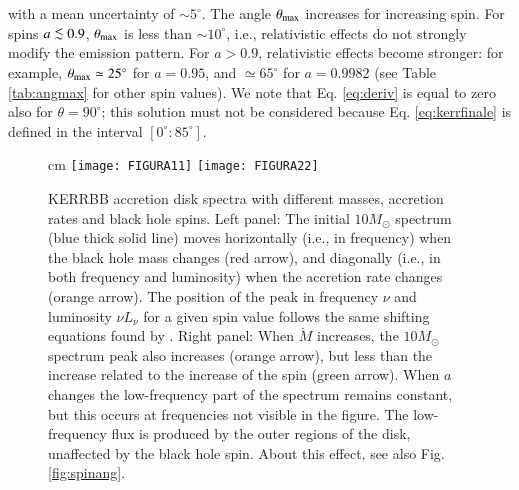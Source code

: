 \documentclass{aa}
\def\spose#1{\hbox to 0pt{#1\hss}}
\newcommand\lsim{\mathrel{\spose{\lower 3pt\hbox{$\mathchar"218$}}
     \raise 2.0pt\hbox{$\mathchar"13C$}}}
\begin{document}
\noindent with a mean uncertainty of $\sim 5^{\circ}$. The angle $\theta_{\rm max}$ increases for increasing spin. For spins $a \lsim 0.9$, $\theta_{\rm max}$ is less than $\sim 10^{\circ}$, i.e., relativistic effects do not strongly modify the emission pattern. For $a > 0.9$, relativistic effects become stronger: for example, $\theta_{\rm max} \simeq 25^{\circ}$ for $a = 0.95$, and $\simeq 65^{\circ}$ for $a = 0.9982$ (see Table \ref{tab:angmax} for other spin values). We note that Eq. \eqref{eq:deriv} is equal to zero also for $\theta = 90^{\circ}$; this solution must not be considered because Eq. \eqref{eq:kerrfinale} is defined in the interval $[0^{\circ}:85^{\circ}]$.

\begin{figure*}
\centering
{} cm
\texttt{[image: FIGURA11]} \qquad \texttt{[image: FIGURA22]}
\caption{
KERRBB accretion disk spectra with different masses, accretion rates and black hole spins. Left panel: The initial $10 M_{\odot}$ spectrum (blue thick solid line) moves horizontally (i.e., in frequency) when the black hole mass changes (red arrow), and diagonally (i.e., in both frequency and luminosity) when the accretion rate changes (orange arrow). The position of the peak in frequency $\nu$ and luminosity $\nu L_{\nu}$ for a given spin value follows the same shifting equations found by \citet{Caldero}. Right panel: When $\dot M$ increases, the $10 M_{\odot}$ spectrum peak also increases (orange arrow), but less than the increase related to the increase of the spin (green arrow). When $a$ changes the low-frequency part of the spectrum remains constant, but this occurs at frequencies not visible in the figure. The low-frequency flux is produced by the outer regions of the disk, unaffected by the black hole spin. About this effect, see also Fig. \eqref{fig:spinang}.
} 
\label{fig4}
\end{figure*}
 
\end{document}

